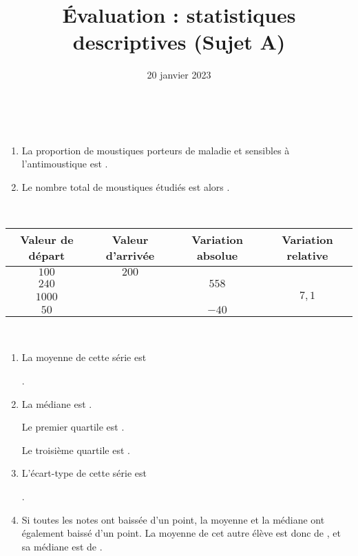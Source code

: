 \documentclass[
	classe=$2^{de}$,
	headerTitle=Évaluation\space Chapitre\space 4
]{évaluation}
\title{Évaluation : statistiques descriptives (Sujet A)}
\date{20 janvier 2023}
\begin{document}
\maketitle

\begin{exercice}\

	\begin{enumerate}
		\item La proportion de moustiques porteurs de maladie et sensibles à l'antimoustique est .
		\item Le nombre total de moustiques étudiés est alors .
	\end{enumerate}
\end{exercice}

\begin{exercice}\

	\begin{center}
		\begin{tabular}{|c|c|c|c|}
			\hline
			Valeur de départ & Valeur d'arrivée    & Variation absolue   & Variation relative   \\ \hline
			$100$            & $200$               & \correction{$100$}  & \correction{1}       \\ \hline
			$240$            & \correction{$798$}  & $558$               & \correction{$2,325$} \\ \hline
			$1000$           & \correction{$8100$} & \correction{$7100$} & $7,1$                \\ \hline
			$50$             & \correction{$10$}   & $-40$               & \correction{$-0,8$}  \\ \hline
		\end{tabular}
	\end{center}
\end{exercice}

\begin{exercice}\

	\begin{enumerate}
		\item La moyenne de cette série est

		      .
		\item La médiane est .

		      Le premier quartile est .

		      Le troisième quartile est .
		\item L'écart-type de cette série est

		      .
		\item Si toutes les notes ont baissée d'un point, la moyenne et la médiane ont également baissé d'un point. La moyenne de cet autre élève est donc de , et sa médiane est de .
	\end{enumerate}
\end{exercice}
\end{document}
